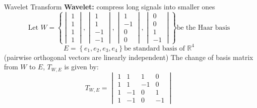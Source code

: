 \documentclass{beamer}
\begin{document}
\begin{frame}[t]{Wavelet Transform}
    \textbf{Wavelet:} compress long signals into smaller ones
    \[
    \text{Let } W = 
    \left
    \{
    \begin{vmatrix}
      1 \\
      1 \\
      1 \\
      1 
    \end{vmatrix}
    ,
    \begin{vmatrix}
      1 \\
      1 \\
     -1 \\
     -1 
    \end{vmatrix}
    ,
    \begin{vmatrix}
      1 \\
     -1 \\
      0 \\
      0
    \end{vmatrix}
    ,
    \begin{vmatrix}
      0 \\
      0 \\
      1 \\
     -1
    \end{vmatrix}
    \right
    \}
    \text{be the Haar basis}
    \]
    \[
    E = \left\{e_1, e_2, e_3, e_4 \right\} \text{be standard basis of }  \mathbb{R}^4
    \]
    \normalsize
    (pairwise orthogonal vectors are linearly independent)\newline
    The change of basis matrix from $W$ to $E$, $T_{W,E}$ is given by:
    \[T_{W,E} = 
        \begin{vmatrix}
            1 & 1 & 1 & 0 \\
            1 & 1 & -1 & 0\\
            1 & -1 & 0 & 1\\
            1 & -1 & 0 & -1 
          \end{vmatrix}
    \]
\end{frame} 
\end{document}
